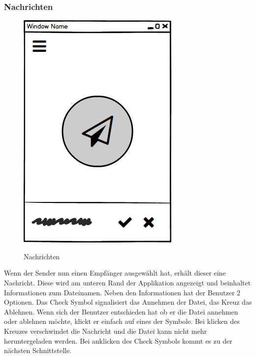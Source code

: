 \subsubsection{Nachrichten}
\begin{figure}[H]
	\centering
	\includegraphics[width=.7\linewidth]{pictures/Desktop/Nachricht.png}\
	\caption{Nachrichten}
\end{figure}
Wenn der Sender nun einen Empfänger ausgewählt hat, erhält dieser eine Nachricht. Diese wird am unteren Rand der Applikation angezeigt und beinhaltet Informationen zum Dateinamen. Neben den Informationen hat der Benutzer 2 Optionen. Das Check Symbol signalisiert das Annehmen der Datei, das Kreuz das Ablehnen. Wenn sich der Benutzer entschieden hat ob er die Datei annehmen oder ablehnen möchte, klickt er einfach auf eines der Symbole. Bei klicken des Kreuzes verschwindet die Nachricht und die Datei kann nicht mehr heruntergeladen werden. Bei anklicken des Check Symbols kommt es zu der nächsten Schnittstelle.
